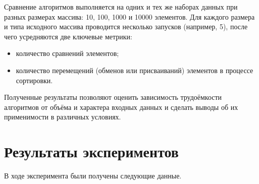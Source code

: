 \documentclass[a4paper,12pt,titlepage,finall]{article}
\begin{document}
Сравнение алгоритмов выполняется на одних и тех же наборах данных при разных размерах массива: 10, 100, 1000 и 10000 элементов. Для каждого размера и типа исходного массива проводится несколько запусков (например, 5), после чего усредняются две ключевые метрики:
\begin{itemize}
\item количество сравнений элементов;
\item количество перемещений (обменов или присваиваний) элементов в процессе сортировки.
\end{itemize}

Полученные результаты позволяют оценить зависимость трудоёмкости алгоритмов от объёма и характера входных данных и сделать выводы об их применимости в различных условиях.

\newpage

\section{Результаты экспериментов}

В ходе эксперимента были получены следующие данные.
\end{document}
